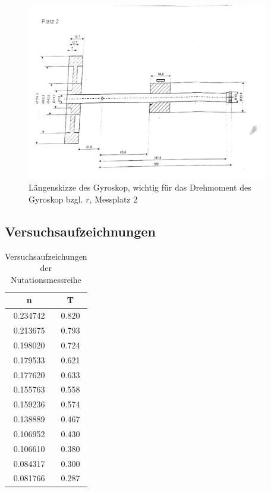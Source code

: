 \documentclass[bibliography=totocnumbered]{scrartcl}
\begin{document}
		\begin{figure}[!ht]
		\centering								 
		\includegraphics[width=300pt]{fotos/gpr1/M10_S2.pdf}			 
		\caption[Längenskizze Gyroskop, P2]{Längenskizze des Gyroskop, wichtig für das Drehmoment des Gyroskop bzgl. $ r $, Messplatz 2}							 
		\label{Abb: Längenskizze Platz 2}							 
	\end{figure}
	
	
	
	\newpage
	\subsection{Versuchsaufzeichnungen}
	
	\begin{table}[ht!]
		\centering
		\caption[Versuchsaufzeichungen]{Versuchsaufzeichungen\\ der Nutationsmessreihe}
	\begin{tabular}{|c|c|}
		\hline
		n &     T \\
		\hline
		0.234742 & 0.820 \\
		0.213675 & 0.793 \\
		0.198020 & 0.724 \\
		0.179533 & 0.621 \\
		0.177620 & 0.633 \\
		0.155763 & 0.558 \\
		0.159236 & 0.574 \\
		0.138889 & 0.467 \\
		0.106952 & 0.430 \\
		0.106610 & 0.380 \\
		0.084317 & 0.300 \\
		0.081766 & 0.287 \\
		\hline
	\end{tabular}
	\label{tab: Nutationswerte}
	\end{table}

	\newpage
	\printbibliography[title={Quellenverzeichnis}]
	
	
\end{document}
